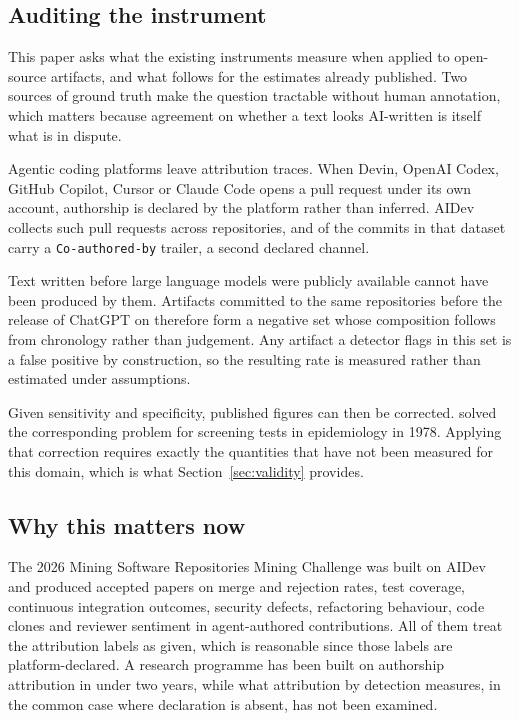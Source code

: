\subsection{Auditing the instrument}
\label{sec:intro:inversion}

This paper asks what the existing instruments measure when applied to open-source
artifacts, and what follows for the estimates already published. Two sources of ground
truth make the question tractable without human annotation, which matters because
agreement on whether a text looks AI-written is itself what is in dispute.

Agentic coding platforms leave attribution traces. When Devin, OpenAI Codex, GitHub
Copilot, Cursor or Claude Code opens a pull request under its own account, authorship is
declared by the platform rather than inferred. AIDev collects \AidevPRs{} such pull
requests across \AidevRepos{} repositories, and \AidevTrailerRate{} of the commits in
that dataset carry a \texttt{Co-authored-by} trailer, a second declared channel.

Text written before large language models were publicly available cannot have been
produced by them. Artifacts committed to the same repositories before the release of
ChatGPT on \LlmCutoff{} therefore form a negative set whose composition follows from
chronology rather than judgement. Any artifact a detector flags in this set is a false
positive by construction, so the resulting rate is measured rather than estimated under
assumptions.

Given sensitivity and specificity, published figures can then be corrected.
\citet{rogan1978estimating} solved the corresponding problem for screening tests in
epidemiology in 1978. Applying that correction requires exactly the quantities that have
not been measured for this domain, which is what Section~\ref{sec:validity} provides.

\subsection{Why this matters now}
\label{sec:intro:now}

The 2026 Mining Software Repositories Mining Challenge was built on AIDev and produced
 accepted papers on merge and rejection rates, test coverage, continuous
integration outcomes, security defects, refactoring behaviour, code clones and reviewer
sentiment in agent-authored contributions. All of them treat the attribution labels as
given, which is reasonable since those labels are platform-declared. A research
programme has been built on authorship attribution in under two years, while what
attribution by detection measures, in the common case where declaration is absent, has
not been examined.


